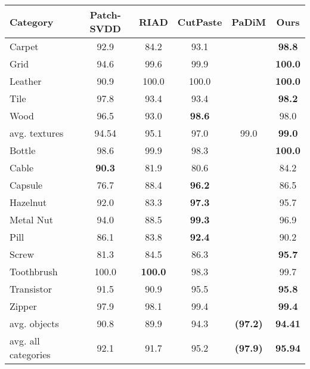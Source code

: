 \documentclass[final,5p,times,twocolumn]{elsarticle}
\begin{document}
	\begin{table*}[h]
		\begin{center}
			\begin{tabular}{|l c c c c c|} 
				\hline
				Category & Patch-SVDD \cite{Yi_2020_ACCV} & RIAD \cite{ZAVRTANIK2021107706} & CutPaste \cite{li2021cutpaste} &PaDiM \cite{defard2020padim} &Ours \\
				\hline \hline
				Carpet & 92.9 & 84.2& 93.1 & & \textbf{98.8} \\
				Grid & 94.6 & 99.6 & 99.9 & &  \textbf{100.0} \\
				Leather& 90.9 & 100.0& 100.0 & & \textbf{100.0}  \\
				Tile & 97.8 & 93.4 & 93.4 & & \textbf{98.2} \\
				Wood & 96.5 & 93.0 & \textbf{98.6} & & 98.0 \\
				\hline
				avg. textures & 94.54 & 95.1 & 97.0 & 99.0 & \textbf{99.0} \\
				\hline 
				Bottle & 98.6 & 99.9 & 98.3 & & \textbf{100.0} \\
				Cable & \textbf{90.3 }& 81.9 &  80.6  & & 84.2  \\
				Capsule & 76.7 & 88.4 &  \textbf{96.2} & & 86.5 \\
				Hazelnut & 92.0 & 83.3 & \textbf{97.3} & & 95.7 \\
				Metal Nut & 94.0 & 88.5 & \textbf{99.3} & & 96.9 \\
				Pill & 86.1 & 83.8 & \textbf{92.4} & & 90.2  \\
				Screw & 81.3 & 84.5 & 86.3 & & \textbf{95.7}  \\
				Toothbrush & 100.0 & \textbf{100.0} & 98.3 & & 99.7 \\
				Transistor& 91.5 & 90.9 & 95.5 & & \textbf{95.8} \\
				Zipper & 97.9 & 98.1 & 99.4 & & \textbf{99.4} \\
				\hline
				avg. objects & 90.8 & 89.9 & 94.3 & \textbf{(97.2)} & \textbf{94.41} \\
				\hline 
				avg. all categories & 92.1& 91.7 & 95.2 &\textbf{(97.9)} & \textbf{95.94} \\
				\hline
			\end{tabular}
			\label{table:results}
		\end{center}
	\end{table*}
	
\end{document}
